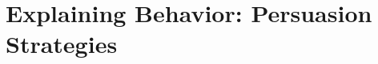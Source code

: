 \documentclass[hidelinks,11pt,a4paper]{report}
\begin{document}

\chapter{Explaining Behavior: Persuasion Strategies}
\label{chatper:Explaining Behavior: Persuasion Strategies}
\end{document}
